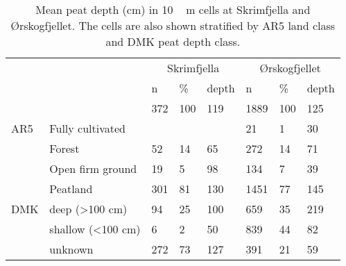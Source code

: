 \begin{table}[tbp]
\caption{Mean peat depth (cm) in \unit{10\,m} cells at Skrimfjella and Ørskogfjellet. The cells are also shown stratified by AR5 land class and DMK peat depth class.}
\begin{tabular}{llllllll}
\hline
    &                            & \multicolumn{3}{c}{Skrimfjella} & \multicolumn{3}{c}{Ørskogfjellet} \\ \cline{3-8} 
    &                            & n        & \%      & depth      & n          & \%      & depth      \\ \hline
    &                            & 372      & 100     & 119        & 1889       & 100     & 125        \\
AR5 & Fully cultivated           &          &         &            & 21         & 1       & 30         \\
    & Forest                     & 52       & 14      & 65         & 272        & 14      & 71         \\
    & Open firm ground           & 19       & 5       & 98         & 134        & 7       & 39         \\
    & Peatland                   & 301      & 81      & 130        & 1451       & 77      & 145        \\
DMK & deep (\textgreater 100 cm) & 94       & 25      & 100        & 659        & 35      & 219        \\
    & shallow (\textless 100 cm) & 6        & 2       & 50         & 839        & 44      & 82         \\
    & unknown                    & 272      & 73      & 127        & 391        & 21      & 59         \\ \hline
\end{tabular}
\label{tab:depthsByClass}
\end{table}